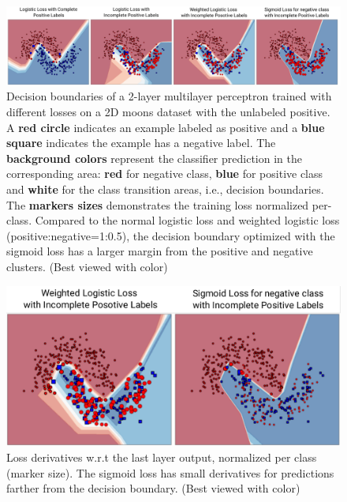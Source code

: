 \begin{figure}
\begin{center}
   \includegraphics[width=0.95\linewidth]{img/moons.pdf}
\end{center}
   \caption{
   Decision boundaries of a 2-layer multilayer perceptron trained with different losses on a 2D moons dataset with the unlabeled positive.
   A \textbf{red circle} indicates an example labeled as positive and a \textbf{blue square} indicates the example has a negative label.
   The \textbf{background colors} represent the classifier prediction in the corresponding area: \textbf{red} for negative class, \textbf{blue} for positive class and \textbf{white} for the class transition areas, i.e., decision boundaries.
   The \textbf{markers sizes} demonstrates the training loss normalized per-class.
   Compared to the normal logistic loss and weighted logistic loss (positive:negative=1:0.5), the decision boundary optimized with the sigmoid loss has a larger margin from the positive and negative clusters.
   (Best viewed with color)
   }
\label{fig:moons}
\end{figure}


\begin{figure}[t]
\begin{center}
   \includegraphics[width=\linewidth]{img/moons_diff}
\end{center}
   \caption{
   Loss derivatives w.r.t the last layer output, normalized per class (marker size).
   The sigmoid loss has small derivatives for predictions farther from the decision boundary.
   (Best viewed with color)
   }
\label{fig:moonsdiff}
\end{figure}



